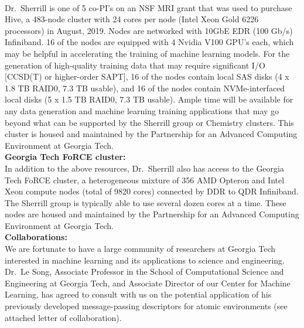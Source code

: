 \documentclass[12pt]{article}
\begin{document}
 \\ Dr.~Sherrill is one of
5 co-PI's on an NSF MRI grant that was used to purchase Hive,
a 483-node cluster with 24 cores per node (Intel Xeon Gold 6226
processors) in August, 2019.  Nodes are networked with 10GbE EDR
(100 Gb/s) Infiniband.  16 of the nodes are equipped with 4 Nvidia
V100 GPU's each, which may be helpful in accelerating the training of
machine learning models.  For the generation of high-quality training
data that may require significant I/O [CCSD(T) or higher-order SAPT], 16
of the nodes contain local SAS disks (4 x 1.8 TB RAID0, 7.3 TB usable),
and 16 of the nodes contain NVMe-interfaced local disks (5 x 1.5 TB
RAID0, 7.3 TB usable).  Ample time will be
available for any data generation and machine learning training
applications that may go beyond what can be supported by the Sherrill
group or Chemistry clusters.  This cluster is housed and maintained by
the Partnership for an Advanced Computing Environment at Georgia Tech.
\\

\noindent
{\bf Georgia Tech FoRCE cluster:} \\
In addition to the above resources, Dr.~Sherrill also has access to the
Georgia Tech FoRCE cluster, a heterogeneous mixture of 356 AMD Opteron
and Intel Xeon compute nodes (total of 9820 cores) connected by DDR to
QDR Infiniband.  The Sherrill group is typically able to use several
dozen cores at a time.  These nodes are housed and maintained by the
Partnership for an Advanced Computing Environment at Georgia Tech.
\\

\noindent
{\bf Collaborations:} \\
We are fortunate to have a large community of researchers at Georgia
Tech interested in machine learning and its applications to science
and engineering.  Dr.~Le Song, Associate Professor in the School of
Computational Science and Engineering at Georgia Tech, and Associate
Director of our Center for Machine Learning, has agreed to consult
with us on the potential application of his previously developed
message-passing descriptors for atomic environments (see attached
letter of collaboration).
\\
\end{document}
